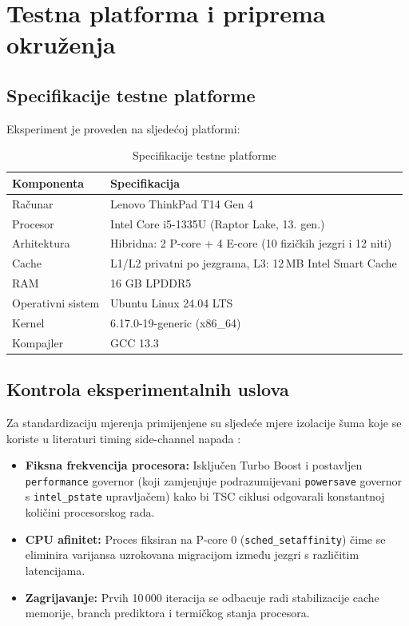 \section{Testna platforma i priprema okruženja}

\subsection{Specifikacije testne platforme}

Eksperiment je proveden na sljedećoj platformi:

\begin{table}[H]
\centering
\caption{Specifikacije testne platforme}
\label{tab:platforma}
\begin{tabular}{ll}
\toprule
\textbf{Komponenta} & \textbf{Specifikacija} \\
\midrule
Računar & Lenovo ThinkPad T14 Gen 4 \\
Procesor & Intel Core i5-1335U (Raptor Lake, 13. gen.) \cite{intel_raptor_lake} \\
Arhitektura & Hibridna: 2 P-core + 4 E-core (10 fizičkih jezgri i 12 niti) \\
Cache & L1/L2 privatni po jezgrama, L3: 12\,MB Intel Smart Cache \\
RAM & 16 GB LPDDR5 \\
Operativni sistem & Ubuntu Linux 24.04 LTS \\
Kernel & 6.17.0-19-generic (x86\_64) \\
Kompajler & GCC 13.3 \\
\bottomrule
\end{tabular}
\end{table}

\subsection{Kontrola eksperimentalnih uslova}

Za standardizaciju mjerenja primijenjene su sljedeće mjere izolacije šuma koje se koriste u literaturi timing side-channel napada \cite{brumley2003, kocher1996}:

\begin{itemize}
\item \textbf{Fiksna frekvencija procesora:} Isključen Turbo Boost i postavljen \texttt{performance} governor (koji zamjenjuje podrazumijevani \texttt{powersave} governor s \texttt{intel\_pstate} upravljačem) kako bi TSC ciklusi odgovarali konstantnoj količini procesorskog rada.
\item \textbf{CPU afinitet:} Proces fiksiran na P-core 0 (\texttt{sched\_setaffinity}) čime se eliminira varijansa uzrokovana migracijom između jezgri s različitim latencijama.
\item \textbf{Zagrijavanje:} Prvih 10\,000 iteracija se odbacuje radi stabilizacije cache memorije, branch prediktora i termičkog stanja procesora.
\end{itemize}

